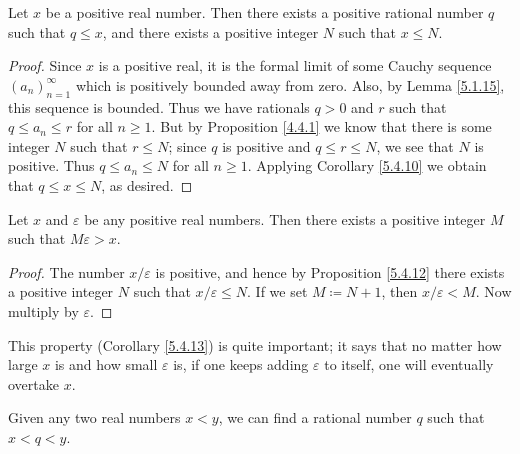 \begin{proposition}\label{5.4.12}
Let \(x\) be a positive real number.
Then there exists a positive rational number \(q\) such that \(q \leq x\), and there exists a positive integer \(N\) such that \(x \leq N\).
\end{proposition}

\begin{proof}
Since \(x\) is a positive real, it is the formal limit of some Cauchy sequence \((a_n)_{n = 1}^{\infty}\) which is positively bounded away from zero.
Also, by Lemma \ref{5.1.15}, this sequence is bounded.
Thus we have rationals \(q > 0\) and \(r\) such that \(q \leq a_n \leq r\) for all \(n \geq 1\).
But by Proposition \ref{4.4.1} we know that there is some integer \(N\) such that \(r \leq N\);
since \(q\) is positive and \(q \leq r \leq N\), we see that \(N\) is positive.
Thus \(q \leq a_n \leq N\) for all \(n \geq 1\).
Applying Corollary \ref{5.4.10} we obtain that \(q \leq x \leq N\), as desired.
\end{proof}

\begin{corollary}\label{5.4.13}
Let \(x\) and \(\varepsilon\) be any positive real numbers.
Then there exists a positive integer \(M\) such that \(M\varepsilon > x\).
\end{corollary}

\begin{proof}
The number \(x / \varepsilon\) is positive, and hence by Proposition \ref{5.4.12} there exists a positive integer \(N\) such that \(x / \varepsilon \leq N\).
If we set \(M \coloneqq N + 1\), then \(x / \varepsilon < M\).
Now multiply by \(\varepsilon\).
\end{proof}

\begin{note}
This property (Corollary \ref{5.4.13}) is quite important;
it says that no matter how large \(x\) is and how small \(\varepsilon\) is, if one keeps adding \(\varepsilon\) to itself, one will eventually overtake \(x\).
\end{note}

\begin{proposition}\label{5.4.14}
Given any two real numbers \(x < y\), we can find a rational number \(q\) such that \(x < q < y\).
\end{proposition}


